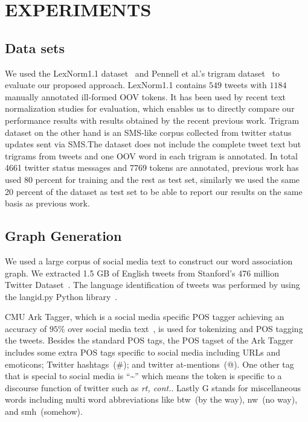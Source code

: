 \documentclass[a4paper,onesided,12pt]{report}
\begin{document}
\chapter{EXPERIMENTS}
\label{sec:experiments}

\section{Data sets}
We used the LexNorm1.1 dataset~\cite{Han:2011:LNS:2002472.2002520} and Pennell et al.'s trigram dataset~\cite{pennell2011character} to evaluate our proposed approach. LexNorm1.1 contains $549$ tweets with $1184$ manually annotated ill-formed OOV tokens. It has been used by recent text normalization studies for evaluation, which enables us to directly compare our performance results with results obtained by the recent previous work. Trigram dataset on the other hand is an SMS-like corpus collected from twitter status updates sent via SMS.\@ The dataset does not include the complete tweet text but trigrams from tweets and one OOV word in each trigram is annotated. In total 4661 twitter status messages and 7769 tokens are annotated, previous work has used 80 percent for training and the rest as test set, similarly we used the same 20 percent of the dataset as test set to be able to report our results on the same basis as previous work.

\section{Graph Generation}
We used a large corpus of social media text to construct our word association graph. We extracted 1.5 GB of English tweets from Stanford's 476 million Twitter Dataset~\cite{DBLP:conf/wsdm/YangL11}. The language identification of tweets was performed by using the langid.py Python library~\cite{Lui:2012:LOL:2390470.2390475, Baldwin:2010:LIL:1857999.1858026}.

CMU Ark Tagger, which is a social media specific POS tagger achieving an accuracy of $95\%$ over social media text~\cite{owoputi2013improved,Gimpel:2011:PTT:2002736.2002747}, is used for tokenizing and POS tagging the tweets. Besides the standard POS tags, the POS tagset of the Ark Tagger includes some extra POS tags specific to social media including URLs and emoticons; Twitter hashtags~(\#); and twitter at-mentions~(@). One other tag that is special to social media is ``\textasciitilde'' which means the token is specific to a discourse function of twitter such as \textit{rt, cont.}. Lastly G stands for miscellaneous words including multi word abbreviations like btw~(by the way), nw~(no way), and smh~(somehow).
\end{document}
